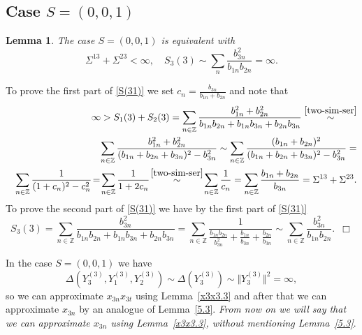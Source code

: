\documentclass[preprint,12pt]{elsarticle}
\newcommand{\commA}[1]{\marginpar{%
\begin{color}{red}
\vskip-\baselineskip %
\raggedright\footnotesize
\itshape\hrule \smallskip A: #1\par\smallskip\hrule\end{color}}}
\newtheorem{lem}[thm]{Lemma}
\numberwithin{equation}{section}
\begin{document}
\subsection{Case $S=(0,0,1)$}
\begin{lem}
\label{l.(001)} 
The case $S=(0,0,1)$ is equivalent with
\begin{equation}
 \label{S(31)}
\Sigma^{13}+\Sigma^{23}<\infty,
\quad S_3(3)\sim \sum_n\frac{b_{3n}^2}{b_{1n}b_{2n}}=\infty.
\end{equation}
\end{lem}
%
\begin{pf}
To prove the first part of \eqref{S(31)}
we set $c_n=\frac{b_{3n}}{b_{1n}+b_{2n}}$ and note that
\begin{eqnarray*}
 &&\infty>S_1(3)+S_2(3)=\sum_{n\in \mathbb Z}\frac{b^2_{1n}+b^2_{2n}}{b_{1n}b_{2n}+b_{1n}b_{3n}+b_{2n}b_{3n}}\stackrel{\eqref{two-sim-ser}}{\sim}\\
&&
\sum_{n\in \mathbb Z}\frac{b_{1n}^2+b_{2n}^2}{(b_{1n}+b_{2n}+b_{3n})^2-b_{3n}^2}\sim 
\sum_{n\in \mathbb Z}\frac{(b_{1n}+b_{2n})^2}{(b_{1n}+b_{2n}+b_{3n})^2-b_{3n}^2}=\\
&&
\sum_{n\in \mathbb Z}\frac{1}{(1+c_n)^2-c_n^2}
\!=\!\sum_{n\in \mathbb Z}\frac{1}{1+2c_n}\!\stackrel{\eqref{two-sim-ser}}{\sim}\!  \sum_{n\in \mathbb Z}\frac{1}{c_n}=\sum_{n\in \mathbb Z}\frac{b_{1n}+b_{2n}}{b_{3n}}=\Sigma^{13}+\Sigma^{23}.
\end{eqnarray*}
To prove the second part of \eqref{S(31)} we have by the first part of \eqref{S(31)}
\begin{equation*}
 S_3(3)\!=\!\sum_{n\in \mathbb Z}\frac{b^2_{3n}}{b_{1n}b_{2n}\!+\!b_{1n}b_{3n}\!+\!b_{2n}b_{3n}}
\!=\!\sum_{n\in \mathbb Z}\frac{1}{\frac{b_{1n}b_{2n}}{b^2_{3n}}+\frac{b_{1n}}{b_{3n}}+\frac{b_{2n}}{b_{3n}}}\!
\sim\!
\sum_{n\in \mathbb Z}\frac{b^2_{3n}}{b_{1n}b_{2n}}.\,\,\,\Box
\end{equation*}
\end{pf}
%
In the case $S=(0,0,1)$ we have
$$
\Delta(Y_3^{(3)}, Y_1^{(3)},Y_2^{(3)})\sim \Delta(Y_3^{(3)})\sim \Vert Y_3^{(3)}\Vert^2=\infty,
$$
so we can approximate $x_{3n}x_{3t}$ using Lemma~\ref{x3x3.3} and after that we can approximate $x_{3n}$ by an analogue of Lemma~\ref{5.3}. 
%
{\it From now on we will say that we can approximate $x_{3n}$ using Lemma~\ref{x3x3.3}, without mentioning   Lemma~\ref{5.3}}. 
\end{document}
